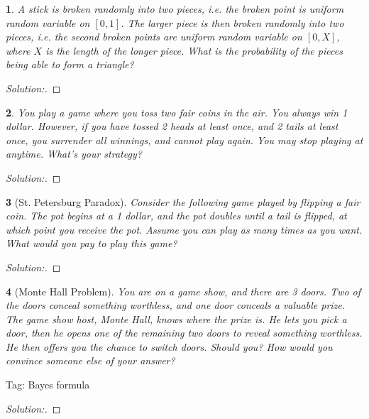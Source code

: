 \documentclass[10pt]{report}
\newtheorem{exe}{}[chapter]
\newenvironment{sol}{\begin{proof}[Solution:]}{\end{proof}}
\begin{document}
\begin{exe}
A stick is broken randomly into two pieces, i.e. the broken point is uniform random variable on $[0, 1]$. The larger piece is then broken randomly into two pieces, i.e. the second broken points are uniform random variable on $[0, X]$, where $X$ is the length of the longer piece. What is the probability of the pieces being able to form a triangle?
\end{exe}
\begin{teacher}
\begin{sol}
\end{sol}
\end{teacher}

\begin{exe}
You play a game where you toss two fair coins in the air. You always win 1 dollar. However, if you have tossed 2 heads at least once, and 2 tails at least once, you surrender all winnings, and cannot play again. You may stop playing at anytime. What's your strategy?
\end{exe}
\begin{teacher}
\begin{sol}
\end{sol}
\end{teacher}

\begin{exe}[St. Petersburg Paradox]
Consider the following game played by flipping a fair coin. The pot begins at a 1 dollar, and the pot doubles until a tail is flipped, at which point you receive the pot. Assume you can play as many times as you want. What would you pay to play this game?
\end{exe}
\begin{teacher}
\begin{sol}
\end{sol}
\end{teacher}

\begin{exe}[Monte Hall Problem]
You are on a game show, and there are 3 doors. Two of the doors conceal something worthless, and one door conceals a valuable prize. The game show host, Monte Hall, knows where the prize is. He lets you pick a door, then he opens one of the remaining two doors to reveal something worthless. He then offers you the chance to switch doors. Should you? How would you convince someone else of your answer?
\end{exe}
Tag: Bayes formula
\begin{teacher}
\begin{sol}
\end{sol}
\end{teacher}
\end{document}
